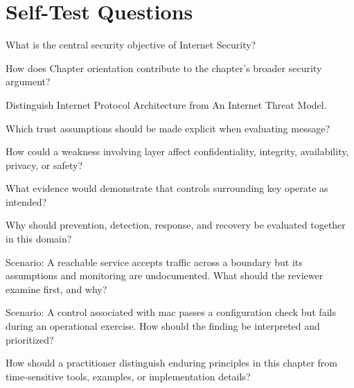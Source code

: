 \documentclass[11pt,letterpaper]{article}
\begin{document}
\section*{Self-Test Questions}
\begin{CornellRecallList}
\item What is the central security objective of Internet Security?
\item How does Chapter orientation contribute to the chapter's broader security argument?
\item Distinguish Internet Protocol Architecture from An Internet Threat Model.
\item Which trust assumptions should be made explicit when evaluating message?
\item How could a weakness involving layer affect confidentiality, integrity, availability, privacy, or safety?
\item What evidence would demonstrate that controls surrounding key operate as intended?
\item Why should prevention, detection, response, and recovery be evaluated together in this domain?
\item Scenario: A reachable service accepts traffic across a boundary but its assumptions and monitoring are undocumented. What should the reviewer examine first, and why?
\item Scenario: A control associated with mac passes a configuration check but fails during an operational exercise. How should the finding be interpreted and prioritized?
\item How should a practitioner distinguish enduring principles in this chapter from time-sensitive tools, examples, or implementation details?
\end{CornellRecallList}
\end{document}
